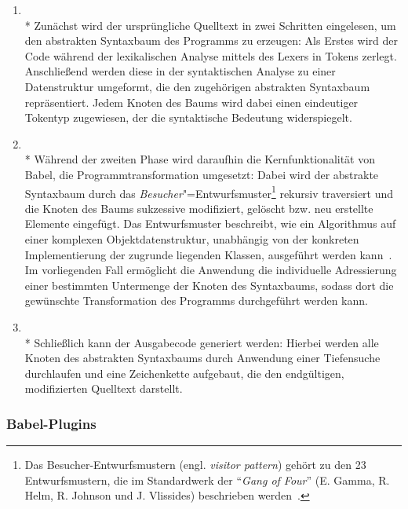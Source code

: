 \begin{enumerate}
  \item {}\\*
    Zunächst wird der ursprüngliche Quelltext in zwei Schritten eingelesen, um den abstrakten Syntaxbaum des Programms zu erzeugen: Als Erstes wird der Code während der lexikalischen Analyse mittels des Lexers in Tokens zerlegt. Anschließend werden diese in der syntaktischen Analyse zu einer Datenstruktur umgeformt, die den zugehörigen abstrakten Syntaxbaum repräsentiert. Jedem Knoten des Baums wird dabei einen eindeutiger Tokentyp zugewiesen, der die syntaktische Bedeutung widerspiegelt.
    \bigbreak
  \item {}\\*
    Während der zweiten Phase wird daraufhin die Kernfunktionalität von Babel, die Programmtransformation umgesetzt: Dabei wird der abstrakte Syntaxbaum durch das \emph{Besucher}"=Entwurfsmuster\footnote{Das Besucher-Entwurfsmustern (engl. \textit{visitor pattern}) gehört zu den 23 Entwurfsmustern, die im Standardwerk  der \enquote{\textit{Gang of Four}} (E. Gamma, R. Helm, R. Johnson und J. Vlissides) beschrieben werden~\autocite[306\psqq]{GAMMA:1994}.} rekursiv traversiert und die Knoten des Baums sukzessive modifiziert, gelöscht bzw. neu erstellte Elemente eingefügt. Das Entwurfsmuster beschreibt, wie ein Algorithmus auf einer komplexen Objektdatenstruktur, unabhängig von der konkreten Implementierung der zugrunde liegenden Klassen, ausgeführt werden kann~\autocite[634\psq]{FREEMAN:2004}. Im vorliegenden Fall ermöglicht die Anwendung die individuelle Adressierung einer bestimmten Untermenge der Knoten des Syntaxbaums, sodass dort die gewünschte Transformation des Programms durchgeführt werden kann.
    \bigbreak
  \item {}\\*
    Schließlich kann der Ausgabecode generiert werden: Hierbei werden alle Knoten des abstrakten Syntaxbaums durch Anwendung einer Tiefensuche durchlaufen und eine Zeichenkette aufgebaut, die den endgültigen, modifizierten Quelltext darstellt.
\end{enumerate}

\subsubsection{Babel-Plugins}
\label{subsec:babel-plugins}


